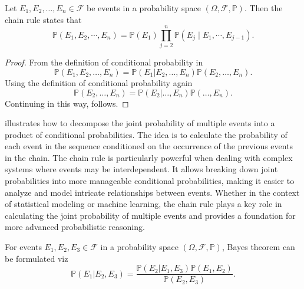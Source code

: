 \begin{theorem}
	\label{theorem:chain_rule}
	Let $E_1, E_2, \ldots, E_n \in \mathcal{F}$ be events in a probability space $(\Omega, \mathcal{F}, \mathbb{P})$. Then the chain rule states that
	\begin{equation}
		\mathbb{P}(E_1, E_2, \cdots ,E_n) 
		= \mathbb{P}(E_1)\prod_{j=2}^{n}\mathbb{P}(E_j \mid E_1, \cdots ,E_{j-1}).
		\label{eq:prod}
	\end{equation}
\end{theorem}

\begin{proof}
	From the definition of conditional probability in 
	\begin{equation}
		\mathbb{P}(E_1, E_2, \ldots, E_n) = \mathbb{P}(E_1|E_2, \dots, E_n)\mathbb{P}(E_2, \dots, E_n).
		\label{eq:p1}
	\end{equation}
	Using the definition of conditional probability again
	\begin{equation}
		\mathbb{P}(E_2, \ldots, E_n) = \mathbb{P}(E_2| \ldots, E_n)\mathbb{P}(\dots, E_n).
	\end{equation}
	Continuing in this way,  follows.
\end{proof}
\begin{remark}
	 illustrates how to decompose the joint probability of multiple events into a product of conditional probabilities. The idea is to calculate the probability of each event in the sequence conditioned on the occurrence of the previous events in the chain. The chain rule is particularly powerful when dealing with complex systems where events may be interdependent. It allows breaking down joint probabilities into more manageable conditional probabilities, making it easier to analyze and model intricate relationships between events. Whether in the context of statistical modeling or machine learning, the chain rule plays a key role in calculating the joint probability of multiple events and provides a foundation for more advanced probabilistic reasoning.
\end{remark}

\begin{theorem}
	\label{theorem:bayes_theorem}
	For events $E_1,E_2,E_3 \in \mathcal{F}$ in a probability space $(\Omega, \mathcal{F}, \mathbb{P})$, Bayes theorem can be formulated viz
	\begin{equation}
		\mathbb{P}(E_1| E_2,E_3) = \frac{\mathbb{P}(E_2| E_1,E_3)\mathbb{P}(E_1,E_2)}{\mathbb{P}(E_2,E_3)}.
		\label{bayes_theorem}
	\end{equation}
\end{theorem}

